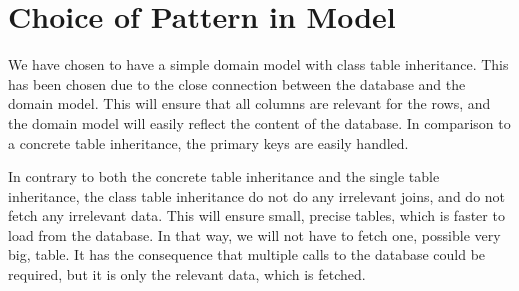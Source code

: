 \section{Choice of Pattern in Model}
We have chosen to have a simple domain model with class table inheritance. This has been chosen due to the close connection between the database and the domain model. This will ensure that all columns are relevant for the rows, and the domain model will easily reflect the content of the database.
In comparison to a concrete table inheritance, the primary keys are easily handled.

In contrary to both the concrete table inheritance and the single table inheritance, the class table inheritance do not do any irrelevant joins, and do not fetch any irrelevant data. This will ensure small, precise tables, which is faster to load from the database. In that way, we will not have to fetch one, possible very big, table. It has the consequence that multiple calls to the database could be required, but it is only the relevant data, which is fetched.